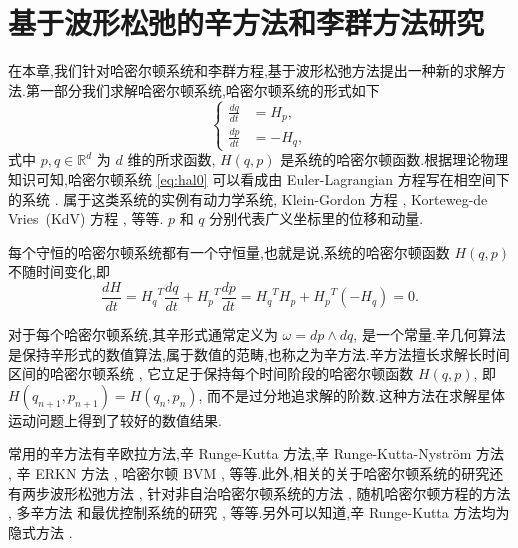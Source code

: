 \chapter{基于波形松弛的辛方法和李群方法研究}

在本章,我们针对哈密尔顿系统和李群方程,基于波形松弛方法提出一种新的求解方法.第一部分我们求解哈密尔顿系统,哈密尔顿系统的形式如下
\begin{equation}\label{eq:hal0}
  \left\lbrace
    \begin{aligned}
      \frac{dq}{dt}&=H_p,\\
      \frac{dp}{dt}&=-H_q,
    \end{aligned}
  \right.
\end{equation}
式中 $p,q \in \mathbb{R}^d$ 为 $d$ 维的所求函数, $H(q,p)$ 是系统的哈密尔顿函数.根据理论物理知识可知,哈密尔顿系统 \eqref{eq:hal0} 可以看成由 Euler-Lagrangian 方程写在相空间下的系统 \cite{frankel2011geometry}. 属于这类系统的实例有动力学系统, Klein-Gordon 方程 \cite{nakanishi2011global}, Korteweg-de Vries~(KdV) 方程 \cite{abdalla2012three}, 等等. $p$ 和 $q$ 分别代表广义坐标里的位移和动量.

每个守恒的哈密尔顿系统都有一个守恒量,也就是说,系统的哈密尔顿函数 $H(q,p)$ 不随时间变化,即
\begin{equation*}
  \frac{dH}{dt}={H_q}^T\frac{dq}{dt}+{H_p}^T\frac{dp}{dt}={H_q}^TH_p+{H_p}^T(-H_q)=0.
\end{equation*}

对于每个哈密尔顿系统,其辛形式通常定义为 $\omega = dp \wedge dq$, 是一个常量.辛几何算法是保持辛形式的数值算法,属于数值的范畴,也称之为辛方法.辛方法擅长求解长时间区间的哈密尔顿系统 \cite{feng2010symplectic,hairer2006geometric}, 它立足于保持每个时间阶段的哈密尔顿函数  $H(q,p)$, 即 $H(q_{n+1},p_{n+1})=H(q_n,p_n)$, 而不是过分地追求解的阶数.这种方法在求解星体运动问题上得到了较好的数值结果.

常用的辛方法有辛欧拉方法,辛 Runge-Kutta 方法,辛 Runge-Kutta-Nystr{\"o}m 方法 \cite{kalogiratou2014fourth,kalogiratou2015}, 辛 ERKN 方法 \cite{wang2014ahigh}, 哈密尔顿 BVM \cite{brugnano2014multi}, 等等.此外,相关的关于哈密尔顿系统的研究还有两步波形松弛方法 \cite{hassanzadeh2014two}, 针对非自治哈密尔顿系统的方法 \cite{hong2000numerical,zhang2010anote}, 随机哈密尔顿方程的方法 \cite{burrage2014structure,ma2015sto,fan2015using}, 多辛方法 \cite{wang2013multi} 和最优控制系统的研究 \cite{li2015asym}, 等等.另外可以知道,辛 Runge-Kutta 方法均为隐式方法 \cite{sanz1988runge}.

